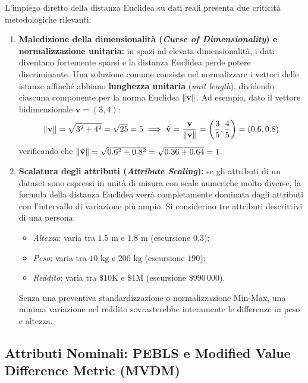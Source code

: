 L'impiego diretto della distanza Euclidea su dati reali presenta due criticit\`a metodologiche rilevanti:
\begin{enumerate}
    \item \textbf{Maledizione della dimensionalit\`a (\textit{Curse of Dimensionality}) e normalizzazione unitaria:} in spazi ad elevata dimensionalit\`a, i dati diventano fortemente sparsi e la distanza Euclidea perde potere discriminante. Una soluzione comune consiste nel normalizzare i vettori delle istanze affinch\'e abbiano \textbf{lunghezza unitaria} (\textit{unit length}), dividendo ciascuna componente per la norma Euclidea $\left\|\mathbf{v}\right\|$. Ad esempio, dato il vettore bidimensionale $\mathbf{v} = (3, 4)$:
    \begin{equation}
        \left\|\mathbf{v}\right\| = \sqrt{3^2 + 4^2} = \sqrt{25} = 5 \implies \hat{\mathbf{v}} = \frac{\mathbf{v}}{\left\|\mathbf{v}\right\|} = \left(\frac{3}{5}, \frac{4}{5}\right) = (0.6, 0.8)
    \end{equation}
    verificando che $\left\|\hat{\mathbf{v}}\right\| = \sqrt{0.6^2 + 0.8^2} = \sqrt{0.36 + 0.64} = 1$.
    \item \textbf{Scalatura degli attributi (\textit{Attribute Scaling}):} se gli attributi di un dataset sono espressi in unit\`a di misura con scale numeriche molto diverse, la formula della distanza Euclidea verr\`a completamente dominata dagli attributi con l'intervallo di variazione pi\`u ampio. Si considerino tre attributi descrittivi di una persona:
    \begin{itemize}
        \item \textit{Altezza}: varia tra $1.5\text{ m}$ e $1.8\text{ m}$ (escursione $0.3$);
        \item \textit{Peso}: varia tra $10\text{ kg}$ e $200\text{ kg}$ (escursione $190$);
        \item \textit{Reddito}: varia tra $\$10\text{K}$ e $\$1\text{M}$ (escursione $\$990\,000$).
    \end{itemize}
    Senza una preventiva standardizzazione o normalizzazione Min-Max, una minima variazione nel reddito sovrasterebbe interamente le differenze in peso e altezza.
\end{enumerate}

\FloatBarrier
\subsection{Attributi Nominali: PEBLS e Modified Value Difference Metric (MVDM)}
\label{subsec:dm-knn-mvdm}


